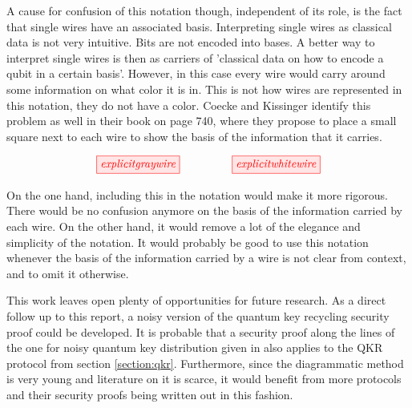 \documentclass[]{article}
\begin{document}
A cause for confusion of this notation though, independent of its role, is the fact that single wires have an associated basis. Interpreting single wires as classical data is not very intuitive. Bits are not encoded into bases. A better way to interpret single wires is then as carriers of 'classical data on how to encode a qubit in a certain basis'. However, in this case every wire would carry around some information on what color it is in. This is not how wires are represented in this notation, they do not have a color. Coecke and Kissinger identify this problem as well in their book \cite{Coecke2017} on page 740, where they propose to place a small square next to each wire to show the basis of the information that it carries. 

\begin{equation}
	\tikzfig{explicitgraywire} ~~~~~~~~~~~~~~ \tikzfig{explicitwhitewire}
\end{equation}

On the one hand, including this in the notation would make it more rigorous. There would be no confusion anymore on the basis of the information carried by each wire. On the other hand, it would remove a lot of the elegance and simplicity of the notation. It would probably be good to use this notation whenever the basis of the information carried by a wire is not clear from context, and to omit it otherwise.

This work leaves open plenty of opportunities for future research. As a direct follow up to this report, a noisy version of the quantum key recycling security proof could be developed. It is probable that a security proof along the lines of the one for noisy quantum key distribution given in \cite{Kissinger2017} also applies to the QKR protocol from section \ref{section:qkr}. Furthermore, since the diagrammatic method is very young and literature on it is scarce, it would benefit from more protocols and their security proofs being written out in this fashion.
\end{document}

